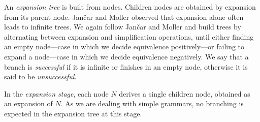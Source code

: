 An \emph{expansion tree} is built from nodes. Children nodes are
obtained by expansion from its parent node. Jan{\v{c}}ar and Moller
observed that expansion alone often leads to infinite trees. We again
follow Jan{\v{c}}ar and Moller and build trees by alternating between
expansion and simplification operations, until either finding an empty
node---case in which we decide equivalence positively---or failing to
expand a node---case in which we decide equivalence negatively.
%
%
We say that a branch is \emph{successful} if it is infinite or
finishes in an empty node, otherwise it is said to be
\emph{unsuccessful}.

In the \emph{expansion stage}, each node $N$ derives a single children
node, obtained as an expansion of $N$. As we are dealing with simple
grammars, no branching is expected in the expansion tree at this
stage.

